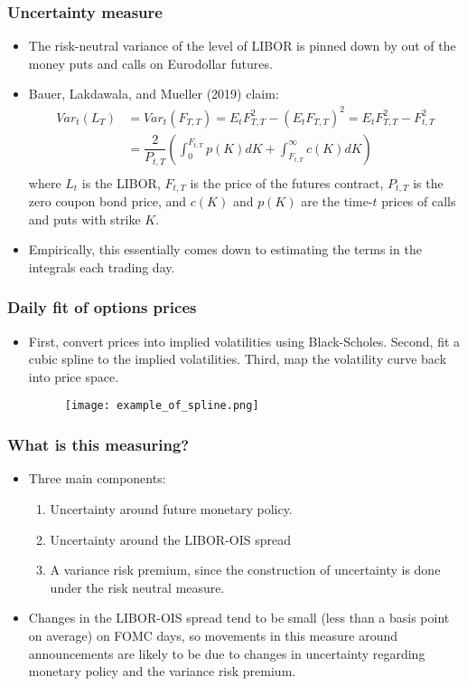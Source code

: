 \documentclass{beamer}
\begin{document}
\begin{frame}
\frametitle{Uncertainty measure}
\begin{itemize}
	\item The risk-neutral variance of the level of LIBOR is pinned down by out of the money puts and calls on Eurodollar futures.  
	\item Bauer, Lakdawala, and Mueller (2019) claim:
	\begin{equation}
	\begin{split}
			Var_{t}(L_{T}) &= Var_{t}(F_{T, T}) = E_{t}F_{T, T}^{2} - (E_{t}F_{T, T})^{2} = E_{t}F_{T, T}^{2} - F_{t, T}^{2}\\
			&= \dfrac{2}{P_{t, T}}\left(\int_{0}^{F_{t, T}}p(K)dK + \int_{F_{t, T}}^{\infty} c(K) dK\right)\\
	\end{split}
	\end{equation}
	where $L_{t}$ is the LIBOR, $F_{t, T}$ is the price of the futures contract, $P_{t, T}$ is the zero coupon bond price, and $c(K)$ and $p(K)$ are the time-$t$ prices of calls and puts with strike $K$. 
	\item Empirically, this essentially comes down to estimating the terms in the integrals each trading day. 
\end{itemize}
\end{frame}

\begin{frame}
\frametitle{Daily fit of options prices}
\begin{itemize}
	\item First, convert prices into implied volatilities using Black-Scholes. Second, fit a cubic spline to the implied volatilities. Third, map the volatility curve back into price space. 
	\begin{figure}
		\centering
		\texttt{[image: example\_of\_spline.png]}
	\end{figure}
\end{itemize}
\end{frame}


\begin{frame}
\frametitle{What is this measuring?}
	\begin{itemize}
		\item Three main components:
		\begin{enumerate}
			\item Uncertainty around future monetary policy. 
			\item Uncertainty around the LIBOR-OIS spread
			\item A variance risk premium, since the construction of uncertainty is done under the risk neutral measure. 
		\end{enumerate}
	\item Changes in the LIBOR-OIS spread tend to be small (less than a basis point on average) on FOMC days, so movements in this measure around announcements are likely to be due to changes in uncertainty regarding monetary policy and the variance risk premium. 
	\end{itemize}
\end{frame}
\end{document}

